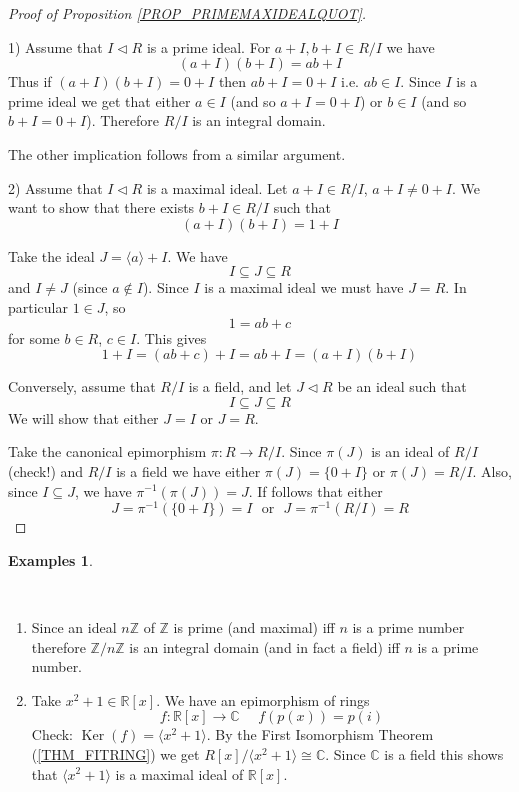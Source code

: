 \documentclass[12pt, letterpaper, oneside]{article}
\theoremstyle{plain}
\theoremstyle{definition}
\newtheorem{examples}[theorem]{Examples}
\newcommand{\lra}{\longrightarrow}
\newcommand{\Z}{{\mathbb Z}}
\newcommand{\R}{{\mathbb R}}
\newcommand{\C}{{\mathbb C}}
\newcommand{\Ker}{\operatorname{Ker}}
\newcommand{\subgp}[1]{\langle#1\rangle}
\newcommand{\benu}{\begin{enumerate}}
\newcommand{\eenu}{\end{enumerate}}
\newcommand{\vs}{\vskip 5mm}
\newcommand{\isep}[1][0]{\setlength{\itemsep}{#1 mm}}
\begin{document}
\begin{proof}[Proof of Proposition \ref{PROP_PRIMEMAXIDEALQUOT}] \ 

1) Assume that $I\lhd R$ is a prime ideal.  For $a+I, b+I\in R/I$ we have 
$$(a + I )(b+I) = ab + I$$ 
Thus if $(a+I)(b+I) = 0 +I$ then $ab + I = 0 + I$ i.e. $ab\in I$.  Since $I$ is a prime ideal
we get that either $a\in I$ (and so $a+ I = 0 + I$) or $b\in I$ (and so $b+I = 0 + I$). 
Therefore $R/I$ is an integral domain.  

The other implication follows from a similar argument. 

\vs\vs

2) Assume that $I\lhd R$ is a maximal ideal. Let  $a+I \in R/I$,
$a+I \neq 0 + I$. We want to show that there exists $b+ I \in R/I$ such that  
$$(a+I)(b+I) = 1+I$$


Take the ideal $J =  \subgp{a}+ I$. We have 
$$I \subseteq J \subseteq R$$
and $I \neq J$ (since $a\not\in I$). Since $I$ is a maximal ideal we must have $J = R$. 
In particular $1 \in J$, so 
$$1 = ab + c$$
for some $b\in R$, $c\in I$. This gives
$$1+I = (ab+c) + I = ab + I = (a+ I)(b+I)$$ 


Conversely, assume that $R/I$ is a field, and let $J\lhd R$ be an ideal such that 
$$I \subseteq J \subseteq R$$
We will show that either $J = I$ or $J = R$. 

Take the canonical epimorphism  $\pi\colon R \to R/I$. Since $\pi(J)$ is an ideal of $R/I$
(check!) and $R/I$ is a field we have either $\pi(J) = \{ 0 +I \}$ or $\pi(J) = R/I$. Also, since
$I \subseteq J$,  we have $\pi^{-1}(\pi(J)) = J$. If follows that either 
$$J = \pi^{-1}(\{0+I\}) = I \ \ \ \text{or}  \ \ \ J = \pi^{-1}(R/I) = R$$ 
 
\end{proof}


\vs\vs

\begin{examples}\ 

\vskip -13mm

\ 
\benu
\isep[5]
\item Since an ideal $n\Z$ of $\Z$ is prime (and maximal) iff $n$ is a prime number 
therefore $\Z/n\Z$ is an integral domain (and in fact a field) iff $n$ is a prime number. 

\item Take $x^{2}+1 \in \R[x]$. We have an epimorphism of rings 
$$f\colon \R[x] \lra \C \ \ \ \ \ \  f(p(x)) = p(i)$$
Check:  $\Ker(f) = \subgp{x^{2}+1}$. By the First Isomorphism Theorem (\ref{THM_FITRING})
we get $R[x]/\subgp{x^{2}+1} \cong \C$. Since $\C$ is a field this shows that $\subgp{x^{2}+1}$
is a maximal ideal of $\R[x]$. 

\eenu

\end{examples}
\end{document}
